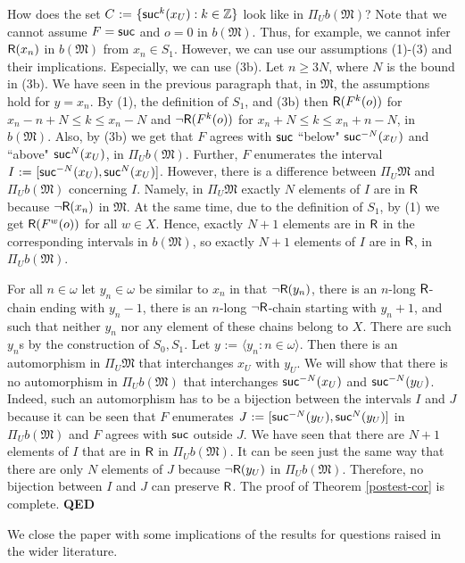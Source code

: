 \documentclass[12pt,leqno]{article}
\newcommand{\de}{\mbox{\ :=\ }}
\newcommand{\Mm}{\mbox{$\mathfrak M$}}
\newcommand{\R}{\mbox{\sf R}}
\newcommand{\Z}{\mathbb Z}
\newcommand{\suc}{\mbox{\sf suc}}
\newcommand{\qed}{\hfill\mbox{\bf QED}\bigskip}
\begin{document}
How does the set $C\de\{\suc^k(x_U) : k\in\Z\}$ look like in $\Pi_Ub(\Mm)$? Note that we cannot assume $F=\suc$ and $o=0$ in $b(\Mm)$. Thus,  for example, we cannot infer $\R(x_n)$ in $b(\Mm)$ from $x_n\in S_1$. However, we can use our assumptions (1)-(3) and their implications. Especially, we can use (3b).
%
Let $n\ge 3N$,  where $N$ is the bound in (3b). We have seen in the previous paragraph that, in $\Mm$, the assumptions hold for $y=x_n$. By (1), the definition of $S_1$, and (3b) then  $\R(F^k(o))$ for $x_n-n+N\le k\le x_n-N$ and $\lnot\R(F^k(o))$ for $x_n+N\le k\le x_n+n-N$, in $b(\Mm)$. Also, by (3b) we get that $F$ agrees with $\suc$ ``below" $\suc^{-N}(x_U)$ and ``above" $\suc^{N}(x_U)$, in $\Pi_Ub(\Mm)$. Further, $F$ enumerates the interval $I\de[\suc^{-N}(x_U),\suc^N(x_U)]$. However, there is a difference between $\Pi_U\Mm$ and $\Pi_Ub(\Mm)$ concerning $I$. Namely, in $\Pi_U\Mm$ exactly  $N$ elements of $I$ are in $\R$ because $\lnot\R(x_n)$ in $\Mm$. At the same time, due to the definition of $S_1$, by (1) we get $\R(F^w(o))$ for all $w\in X$. Hence,  exactly $N+1$ elements are in $\R$ in the corresponding intervals in $b(\Mm)$, so exactly $N+1$ elements of $I$ are in $\R$, in $\Pi_Ub(\Mm)$. 

For all $n\in\omega$ let $y_n\in\omega$ be similar to $x_n$ in that $\lnot\R(y_n)$, there is an $n$-long $\R$-chain ending with $y_n-1$, there is an $n$-long $\lnot\R$-chain starting with $y_n+1$, and such that neither $y_n$ nor any element of these chains belong to $X$. There are such $y_n$s by the construction of $S_0, S_1$. Let $y\de\langle y_n : n\in\omega\rangle$. Then there is an automorphism in $\Pi_U\Mm$ that interchanges $x_U$ with $y_U$.  
%
We will show that there is no automorphism in $\Pi_Ub(\Mm)$ that interchanges $\suc^{-N}(x_U)$ and $\suc^{-N}(y_U)$. Indeed, such an automorphism has to be a bijection between the intervals $I$ and $J$ because it can be seen that $F$ enumerates $J\de[\suc^{-N}(y_U),\suc^N(y_U)]$ in $\Pi_Ub(\Mm)$ and $F$ agrees with $\suc$ outside $J$. We have seen that there are $N+1$ elements of $I$ that are in $\R$ in $\Pi_Ub(\Mm)$. It can be seen just the same way that there are only $N$ elements of $J$ because $\lnot\R(y_U)$ in $\Pi_Ub(\Mm)$. Therefore, no bijection between $I$ and $J$ can preserve $\R$. The proof of Theorem \ref{postest-cor} is complete. %
\qed\bigskip

We close the paper with some implications of the results for questions raised in the wider literature.\bigskip
\end{document}
